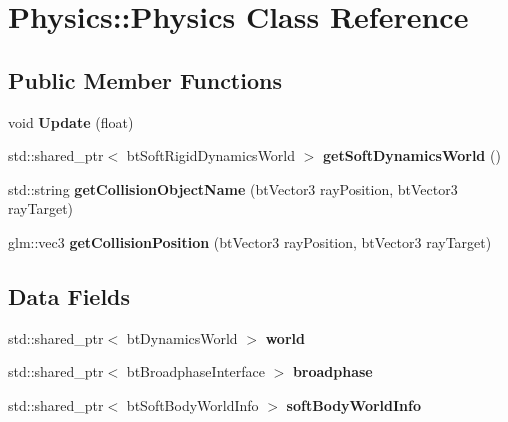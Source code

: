 \hypertarget{class_physics_1_1_physics}{}\section{Physics\+:\+:Physics Class Reference}
\label{class_physics_1_1_physics}
\subsection*{Public Member Functions}
\begin{DoxyCompactItemize}
\item 
void {\bfseries Update} (float)\hypertarget{class_physics_1_1_physics_a4b2969a4b6bfde1ebd56d3fd824cd729}{}\label{class_physics_1_1_physics_a4b2969a4b6bfde1ebd56d3fd824cd729}

\item 
std\+::shared\+\_\+ptr$<$ bt\+Soft\+Rigid\+Dynamics\+World $>$ {\bfseries get\+Soft\+Dynamics\+World} ()\hypertarget{class_physics_1_1_physics_a5a11400f96679a7a9717d00d559ad116}{}\label{class_physics_1_1_physics_a5a11400f96679a7a9717d00d559ad116}

\item 
std\+::string {\bfseries get\+Collision\+Object\+Name} (bt\+Vector3 ray\+Position, bt\+Vector3 ray\+Target)\hypertarget{class_physics_1_1_physics_ad1c064c28d05b82cc92d0d52795b4a30}{}\label{class_physics_1_1_physics_ad1c064c28d05b82cc92d0d52795b4a30}

\item 
glm\+::vec3 {\bfseries get\+Collision\+Position} (bt\+Vector3 ray\+Position, bt\+Vector3 ray\+Target)\hypertarget{class_physics_1_1_physics_a1c0684ae48f618305129da7d4e0b35de}{}\label{class_physics_1_1_physics_a1c0684ae48f618305129da7d4e0b35de}

\end{DoxyCompactItemize}
\subsection*{Data Fields}
\begin{DoxyCompactItemize}
\item 
std\+::shared\+\_\+ptr$<$ bt\+Dynamics\+World $>$ {\bfseries world}\hypertarget{class_physics_1_1_physics_a2673bbfa65758410f0f59b634d29a74d}{}\label{class_physics_1_1_physics_a2673bbfa65758410f0f59b634d29a74d}

\item 
std\+::shared\+\_\+ptr$<$ bt\+Broadphase\+Interface $>$ {\bfseries broadphase}\hypertarget{class_physics_1_1_physics_aedd523a6223a65b5563d37b136b30aa6}{}\label{class_physics_1_1_physics_aedd523a6223a65b5563d37b136b30aa6}

\item 
std\+::shared\+\_\+ptr$<$ bt\+Soft\+Body\+World\+Info $>$ {\bfseries soft\+Body\+World\+Info}\hypertarget{class_physics_1_1_physics_aba05637660cabca9cb0fee0dd15e984a}{}\label{class_physics_1_1_physics_aba05637660cabca9cb0fee0dd15e984a}

\end{DoxyCompactItemize}
